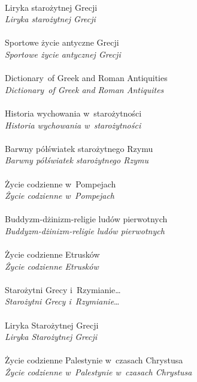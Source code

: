 \documentclass[a4paper,11pt]{article}
\begin{document}
 \\
\Jest  Liryka starożytnej Grecji \\
\Powin \emph{Liryka starożytnej Grecji} \\
 \\
\Jest  Sportowe życie antyczne Grecji \\
\Powin \emph{Sportowe życie antycznej Grecji} \\
 \\
\Jest  Dictionary~of Greek and Roman Antiquities \\
\Powin \emph{Dictionary~of Greek and Roman Antiquites} \\
 \\
\Jest  Historia wychowania w~starożytności \\
\Powin \emph{Historia wychowania w~starożytności} \\
 \\
\Jest  Barwny półświatek starożytnego Rzymu \\
\Powin \emph{Barwny półświatek starożytnego Rzymu} \\
 \\
\Jest  Życie codzienne w~Pompejach \\
\Powin \emph{Życie codzienne w~Pompejach} \\
 \\
\Jest  Buddyzm-dżinizm-religie ludów pierwotnych \\
\Powin \emph{Buddyzm-dżinizm-religie ludów pierwotnych} \\
 \\
\Jest  Życie codzienne Etrusków \\
\Powin \emph{Życie codzienne Etrusków} \\
 \\
\Jest  Starożytni Grecy i~Rzymianie\ldots \\
\Powin \emph{Starożytni Grecy i~Rzymianie}\ldots \\
 \\
\Jest  Liryka Starożytnej Grecji \\
\Powin \emph{Liryka Starożytnej Grecji} \\
 \\
\Jest  Życie codzienne Palestynie w~czasach Chrystusa \\
\Powin \emph{Życie codzienne w~Palestynie w~czasach Chrystusa} \\
 \\
\end{document}
